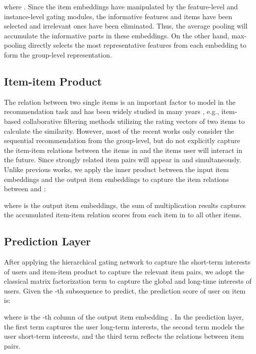 \documentclass[sigconf]{acmart}
\begin{document}
where . Since the item embeddings have manipulated by the feature-level and instance-level gating modules, the informative features and items have been selected and irrelevant ones have been eliminated. Thus, the average pooling will accumulate the informative parts in these embeddings. On the other hand, max-pooling directly selects the most representative features from each embedding to form the group-level representation.

\subsection{Item-item Product}
The relation between two single items is an important factor to model in the recommendation task and has been widely studied in many years \cite{DBLP:reference/sp/NingDK15,DBLP:conf/kdd/KabburNK13}, e.g., item-based collaborative filtering methods utilizing the rating vectors of two items to calculate the similarity. However, most of the recent works \cite{DBLP:conf/wsdm/TangW18,DBLP:conf/cikm/HidasiK18,DBLP:conf/icdm/KangM18} only consider the sequential recommendation from the group-level, but do not explicitly capture the item-item relations between the items in  and the items user will interact in the future. Since strongly related item pairs will appear in  and  simultaneously. Unlike previous works, we apply the inner product between the input item embeddings and the output item embeddings to capture the item relations between  and :

where  is the output item embeddings, the sum of multiplication results captures the accumulated item-item relation scores from each item in  to all other items.

\subsection{Prediction Layer}
After applying the hierarchical gating network to capture the short-term interests of users and item-item product to capture the relevant item pairs, we adopt the classical matrix factorization term to capture the global and long-time interests of users. Given the -th subsequence to predict, the prediction score of user  on item  is:

where  is the -th column of the output item embedding . In the prediction layer, the first term captures the user long-term interests, the second term models the user short-term interests, and the third term reflects the relations between item pairs.
\end{document}
